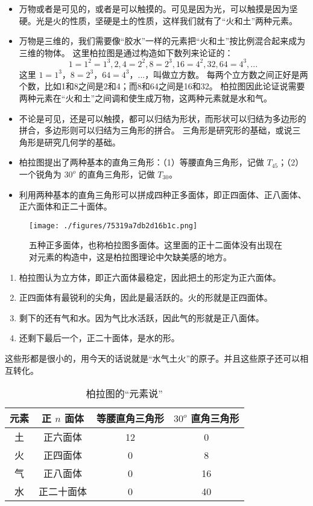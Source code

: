 \begin{itemize}
\item 万物或者是可见的，或者是可以触摸的。可见是因为光，可以触摸是因为坚硬。光是火的性质，坚硬是土的性质，这样我们就有了“火和土”两种元素。

\item 万物是三维的，我们需要像“胶水”一样的元素把“火和土”按比例混合起来成为三维的物体。 这里柏拉图是通过构造如下数列来论证的：
\begin{equation}
1=1^2=1^3, 2, 4=2^2, 8=2^3, 16=4^2, 32, 64=4^3,...~
\end{equation}
这里 $1=1^3$，$8=2^3$，$64=4^3$，...，叫做立方数。 每两个立方数之间正好是两个数，比如1和8之间是2和4；而8和64之间是16和32。 柏拉图因此论证说需要两种元素在“火和土”之间调和使生成万物，这两种元素就是水和气。

\item 不论是可见，还是可以触摸，都可以归结为形状，而形状可以归结为多边形的拼合，多边形则可以归结为三角形的拼合。 三角形是研究形的基础，或说三角形是研究几何学的基础。

\item 柏拉图提出了两种基本的直角三角形：（1）等腰直角三角形，记做 $T_{45}$；（2）一个锐角为 $30^o$ 的直角三角形，记做 $T_{30}$。

\item 利用两种基本的直角三角形可以拼成四种正多面体，即正四面体、正八面体、正六面体和正二十面体。
\end{itemize}

\begin{figure}[ht]
\centering
\texttt{[image: ./figures/75319a7db2d16b1c.png]}
\caption{五种正多面体，也称柏拉图多面体。这里面的正十二面体没有出现在对元素的构造中，这是柏拉图理论中欠缺美感的地方。} \label{fig_AtomId_2}
\end{figure}

\begin{enumerate}
\item 柏拉图认为立方体，即正六面体最稳定，因此把土的形定为正六面体。
\item 正四面体有最锐利的尖角，因此是最活跃的。火的形就是正四面体。
\item 剩下的还有气和水。因为气比水活跃，因此气的形就是正八面体。
\item 还剩下最后一个，正二十面体，是水的形。
\end{enumerate}

这些形都是很小的，用今天的话说就是“水气土火”的原子。并且这些原子还可以相互转化。

\begin{table}[ht]
\centering
\caption{柏拉图的“元素说”}\label{tab_AtomId_1}
\begin{tabular}{|c|c|c|c|}
\hline
元素 & 正 $n$ 面体 & 等腰直角三角形 & $30^o$ 直角三角形 \\
\hline
土 & 正六面体 & 12 & 0  \\
\hline
火 & 正四面体 & 0 & 8 \\
\hline
气 & 正八面体 & 0 & 16 \\
\hline
水 & 正二十面体 & 0 & 40\\
\hline
\end{tabular}
\end{table}

